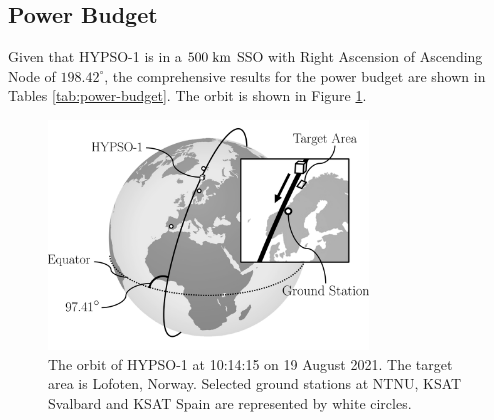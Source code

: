 \subsection{Power Budget}
Given that HYPSO-1 is in a $500 \hspace{3pt} \rm{km}$ SSO with Right Ascension of Ascending Node of $198.42^{\circ}$, the comprehensive results for the power budget are shown in Tables \ref{tab:power-budget}. The orbit is shown in Figure \ref{fig:orbit_hypso}.
\begin{figure}[tbhp]
  \begin{center}
    \includegraphics[width=85mm,angle=0]{figs/orbit_hypso.png}
    \caption{The orbit of HYPSO-1 at 10:14:15 on 19 August 2021. The target area is Lofoten, Norway. Selected ground stations at NTNU, KSAT Svalbard and KSAT Spain are represented by white circles.}
    \label{fig:orbit_hypso}
\end{center}
\end{figure}
